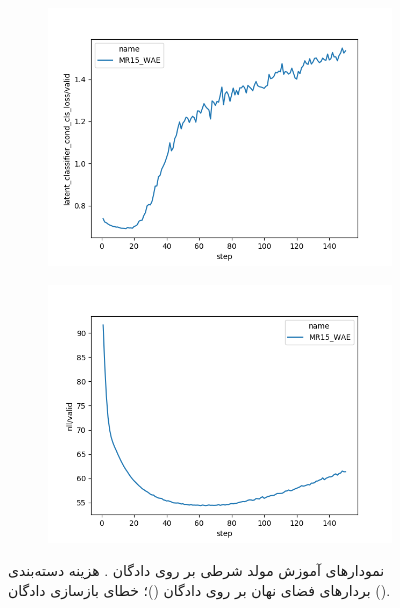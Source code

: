 \begin{figure}[h]
    \centering
    \begin{subfigure}{0.3\textheight}
        \centering
        \includegraphics[width=1.\textwidth]{images/figs2/2020_01_15__11_45_45__latent_classifier_cond_cls_loss.png}
        \caption{}
        \label{fig:chap4:mr15_cls}
    \end{subfigure}
    \begin{subfigure}{0.3\textheight}
        \centering
        \includegraphics[width=1.\textwidth]{images/figs2/2020_01_15__11_45_45__nll.png}
        \caption{}
        \label{fig:chap4:mr15_nll}
    \end{subfigure}
    \caption{
        نمودار‌های آموزش مولد شرطی بر روی دادگان \sst{}.
       هزینه دسته‌بندی بردار‌های فضای نهان بر روی دادگان \validation{}
        ()؛
خطای بازسازی دادگان \validation{}
        ().
    }
    \label{fig:chap4:mr15}
\end{figure}
